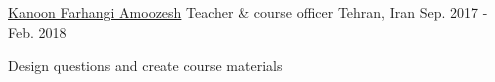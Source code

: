 \begin{cventries}
  \cventry
  {\href{http://www.kanoon.ir/}{Kanoon Farhangi Amoozesh}} %
  {Teacher \& course officer} %
  {Tehran, Iran} %
  {Sep. 2017 - Feb. 2018} %
  {
    \begin{cvitems} %
      \item {Design questions and create course materials}
    \end{cvitems}
  }


\end{cventries}
